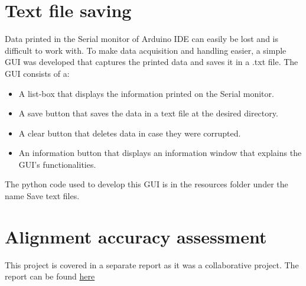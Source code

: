 \section{Text file saving}
Data printed in the Serial monitor of Arduino IDE can easily be lost and is difficult to work with. To make data acquisition and handling easier, a simple GUI was developed that captures the printed data and saves it in a .txt file. The GUI consists of a:
\begin{itemize}
\item A list-box that displays the information printed on the Serial monitor. 
\item A save button that saves the data in a text file at the desired directory.
\item A clear button that deletes data in case they were corrupted.
\item An information button that displays an information window that explains the GUI's functionalities.
\end{itemize}

The python code used to develop this GUI is in the resources folder under the name Save text files.


\section{Alignment accuracy assessment}
This project is covered in a separate report as it was a collaborative project. The report can be found \href{https://www.overleaf.com/project/68b80f7fcdcfcb7936a1d5bc/invite/token/de0f1a7e7403cbb879994c8860daa5b3b4d8ab23ba6d160b}{here}


